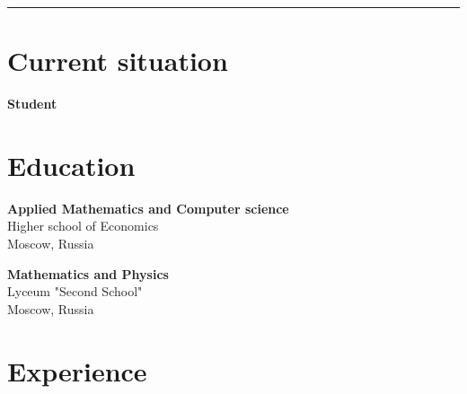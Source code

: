\documentclass[a4paper,10pt]{article}
\newcommand{\MyVerticalRule}{%
	\textcolor{ColorOne}{\rule{1pt}{\textheight}}
}
\begin{document}
%
%
%
\hfill
\begin{adjustbox}{valign=t}
\begin{minipage}{0.05\textwidth}
\MyVerticalRule
\end{minipage}
\end{adjustbox}
\hfill
%
\begin{adjustbox}{valign=t}
\begin{minipage}{0.6\textwidth}
\section*{Current situation}
\begin{description}
\raggedright
\item[\normalfont \textcolor{ColorOne}{2020-now}] \textbf{Student}\\ \medskip

\end{description}

\section*{Education}
	\begin{description}
	\raggedright
	\item [\normalfont \textcolor{ColorOne}{2020-now}] \textbf{Applied Mathematics and Computer science}\\
	Higher school of Economics\\
	Moscow, Russia

	\item [\normalfont \textcolor{ColorOne}{2015-2020}] \textbf{Mathematics and Physics}\\
	Lyceum "Second School"\\
	Moscow, Russia
\end{description}

\section*{Experience}
\begin{description}
\raggedright
\item[\normalfont \textcolor{ColorOne}{No experience!}] 


\end{description}
\end{minipage}
\end{adjustbox}
\end{document}
